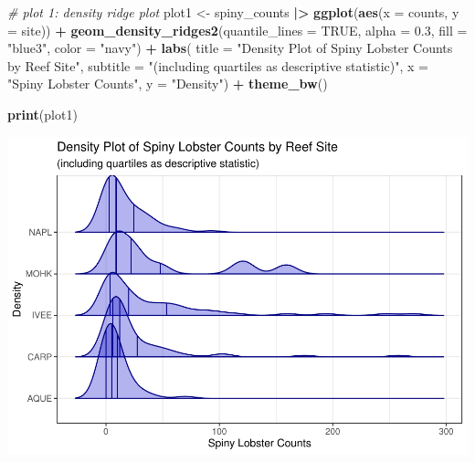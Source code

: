 \documentclass[
]{article}
\newenvironment{Shaded}{\begin{snugshade}}{\end{snugshade}}
\newcommand{\AttributeTok}[1]{\textcolor[rgb]{0.13,0.29,0.53}{#1}}
\newcommand{\CommentTok}[1]{\textcolor[rgb]{0.56,0.35,0.01}{\textit{#1}}}
\newcommand{\ConstantTok}[1]{\textcolor[rgb]{0.56,0.35,0.01}{#1}}
\newcommand{\FloatTok}[1]{\textcolor[rgb]{0.00,0.00,0.81}{#1}}
\newcommand{\FunctionTok}[1]{\textcolor[rgb]{0.13,0.29,0.53}{\textbf{#1}}}
\newcommand{\NormalTok}[1]{#1}
\newcommand{\OtherTok}[1]{\textcolor[rgb]{0.56,0.35,0.01}{#1}}
\newcommand{\SpecialCharTok}[1]{\textcolor[rgb]{0.81,0.36,0.00}{\textbf{#1}}}
\newcommand{\StringTok}[1]{\textcolor[rgb]{0.31,0.60,0.02}{#1}}
\begin{document}
\begin{Shaded}
\begin{Highlighting}[]
\CommentTok{\# plot 1: density ridge plot}
\NormalTok{plot1 }\OtherTok{\textless{}{-}}\NormalTok{ spiny\_counts }\SpecialCharTok{|\textgreater{}} 
    \FunctionTok{ggplot}\NormalTok{(}\FunctionTok{aes}\NormalTok{(}\AttributeTok{x =}\NormalTok{ counts, }\AttributeTok{y =}\NormalTok{ site)) }\SpecialCharTok{+}
    \FunctionTok{geom\_density\_ridges2}\NormalTok{(}\AttributeTok{quantile\_lines =} \ConstantTok{TRUE}\NormalTok{,}
                         \AttributeTok{alpha =} \FloatTok{0.3}\NormalTok{,}
                         \AttributeTok{fill =} \StringTok{"blue3"}\NormalTok{,}
                         \AttributeTok{color =} \StringTok{"navy"}\NormalTok{) }\SpecialCharTok{+}
    \FunctionTok{labs}\NormalTok{(}
        \AttributeTok{title =} \StringTok{"Density Plot of Spiny Lobster Counts by Reef Site"}\NormalTok{,}
        \AttributeTok{subtitle =} \StringTok{"(including quartiles as descriptive statistic)"}\NormalTok{,}
        \AttributeTok{x =} \StringTok{"Spiny Lobster Counts"}\NormalTok{,}
        \AttributeTok{y =} \StringTok{"Density"}\NormalTok{) }\SpecialCharTok{+}
    \FunctionTok{theme\_bw}\NormalTok{()}

\FunctionTok{print}\NormalTok{(plot1)}
\end{Highlighting}
\end{Shaded}

\includegraphics{hw1-lobstrs-eds241_files/figure-latex/unnamed-chunk-5-1.pdf}
\end{document}
